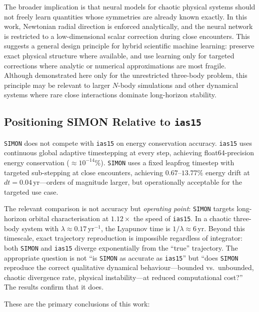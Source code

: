 \documentclass[12pt]{article}
\begin{document}
The broader implication is that neural models for chaotic physical systems should not
freely learn quantities whose symmetries are already known exactly. In this work,
Newtonian radial direction is enforced analytically, and the neural network is restricted
to a low-dimensional scalar correction during close encounters. This suggests a general
design principle for hybrid scientific machine learning: preserve exact physical structure
where available, and use learning only for targeted corrections where analytic or numerical
approximations are most fragile. Although demonstrated here only for the unrestricted
three-body problem, this principle may be relevant to larger $N$-body simulations and
other dynamical systems where rare close interactions dominate long-horizon stability.

\subsection{Positioning SIMON Relative to \texttt{ias15}}

\texttt{SIMON} does not compete with \texttt{ias15} on energy conservation accuracy.
\texttt{ias15} uses continuous global adaptive timestepping at every step, achieving
float64-precision energy conservation ($\approx 10^{-14}\%$). \texttt{SIMON} uses a
fixed leapfrog timestep with targeted sub-stepping at close encounters, achieving
$0.67$--$13.77\%$ energy drift at $dt = 0.04$\,yr---orders of magnitude larger, but
operationally acceptable for the targeted use case.

The relevant comparison is not accuracy but \emph{operating point}: \texttt{SIMON}
targets long-horizon orbital characterisation at $1.12\times$ the speed of
\texttt{ias15}. In a chaotic three-body system with $\lambda \approx 0.17$\,yr$^{-1}$,
the Lyapunov time is $1/\lambda \approx 6$\,yr. Beyond this timescale, exact
trajectory reproduction is impossible regardless of integrator: both \texttt{SIMON}
and \texttt{ias15} diverge exponentially from the ``true'' trajectory. The appropriate
question is not ``is \texttt{SIMON} as accurate as \texttt{ias15}'' but ``does
\texttt{SIMON} reproduce the correct qualitative dynamical behaviour---bounded vs.\
unbounded, chaotic divergence rate, physical instability---at reduced computational
cost?'' The results confirm that it does.

These are the primary conclusions of this work:
\end{document}
